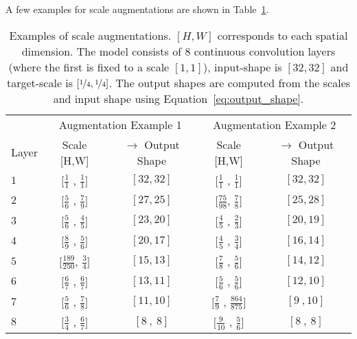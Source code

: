 \begin{appendices}
A few examples for scale augmentations are shown in Table~\ref{tab:scale_augs_examples}.

\renewcommand{\arraystretch}{1.3}
\begin{table}[h!]
    \centering
    \begin{tabular}{l|cc|cc}
    \toprule
                & \multicolumn{2}{c}{Augmentation Example 1}                     & \multicolumn{2}{c}{Augmentation Example 2}                        \\
         Layer  &                {Scale [H,W]}                                & $\to$ Output Shape   & {Scale [H,W]} & $\to$ Output Shape         \\
    \midrule
        $1$     &                $[ \frac{1}{1}$    , $\frac{1}{1}]$          &   $[32,32]$          & $[\frac{1}{1}$  , $\frac{1}{1}]$     & $[32,32]$      \\        
        $2$     &                $[ \frac{5}{6}$    , $\frac{7}{9}]$          &   $[27,25]$          & $[\frac{75}{98}$, $\frac{7}{8}]$     & $[25,28]$      \\        
        $3$     &                $[ \frac{5}{6}$    , $\frac{4}{5}]$          &   $[23,20]$          & $[\frac{4}{5}$  , $\frac{2}{3}]$     & $[20,19]$      \\        
        $4$     &                $[ \frac{8}{9}$    , $\frac{5}{6}]$          &   $[20,17]$          & $[\frac{4}{5}$  , $\frac{3}{4}]$     & $[16,14]$      \\        
        $5$     &                $[ \frac{189}{250}$, $\frac{3}{4}]$          &   $[15,13]$          & $[\frac{7}{8}$  , $\frac{5}{6}]$     & $[14,12]$      \\        
        $6$     &                $[ \frac{6}{7}$    , $\frac{6}{7}]$          &   $[13,11]$          & $[\frac{5}{6}$  , $\frac{5}{6}]$     & $[12,10]$      \\        
        $7$     &                $[ \frac{5}{6}$    , $\frac{7}{8}]$          &   $[11,10]$          & $[\frac{7}{9}$  , $\frac{864}{875}]$ & $[9\ ,10]$      \\        
        $8$     &                $[ \frac{3}{4}$    , $\frac{6}{7}]$          &   $[8\ ,\ 8]$        & $[\frac{9}{10}$ , $\frac{5}{6}]$     & $[8\ ,\ 8]$    \\
    \bottomrule
    \end{tabular}
    \vspace{5pt}
    \caption{Examples of scale augmentations. $[H,W]$ corresponds to each spatial dimension. The model consists of $8$ continuous convolution layers (where the first is fixed to a scale $[1,1]$), input-shape is $[32,32]$ and target-scale is $[\nicefrac{1}{4},\nicefrac{1}{4}]$. The output shapes are computed from the scales and input shape using Equation~\ref{eq:output_shape}.}
    \label{tab:scale_augs_examples}
\end{table}


\end{appendices}
